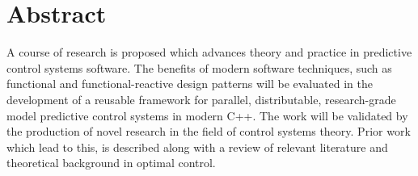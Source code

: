 %
%
\chapter*{Abstract}

A course of research is proposed which advances theory and practice in
predictive control systems software. The benefits of modern software techniques,
such as functional and functional-reactive design patterns will be evaluated in
the development of a reusable framework for parallel, distributable,
research-grade model predictive control systems in modern C++. The work will be
validated by the production of novel research in the field of control systems
theory. Prior work which lead to this, is described along with a review of
relevant literature and theoretical background in optimal control.
